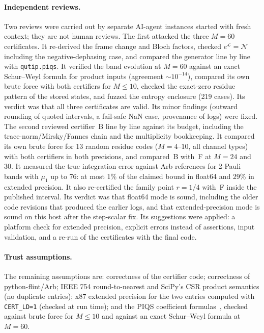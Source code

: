 \documentclass[aps,pra,reprint,superscriptaddress,nofootinbib,longbibliography,floatfix]{revtex4-2}
\theoremstyle{remark}
\begin{document}
\paragraph*{Independent reviews.} Two reviews were carried out by separate AI-agent instances
started with fresh context; they are not human reviews. The first attacked the three $M=60$
certificates. It re-derived the frame change and Bloch factors, checked $e^{\mathcal L}=\mathcal N$
including the negative-dephasing case, and compared the generator line by line with
\texttt{qutip.piqs}. It verified the band evolution at $M=60$ against an exact Schur--Weyl formula for
product inputs (agreement $\sim10^{-14}$), compared its own brute force with both certifiers for
$M\le10$, checked the exact-zero residue pattern of the stored states, and fuzzed the entropy enclosure
(219 cases). Its verdict was that all three certificates are valid. Its minor findings (outward rounding
of quoted intervals, a fail-safe NaN case, provenance of logs) were fixed. The second reviewed
certifier~B line by line against its budget, including the trace-norm/Mirsky/Fannes chain and the
multiplicity bookkeeping. It compared its own brute force for 13 random residue codes ($M=4$--$10$, all
channel types) with both certifiers in both precisions, and compared~B with~F at $M=24$ and $30$. It
measured the true integration error against Arb references for 2-Pauli bands with $\mu_1$ up to 76: at
most 1\% of the claimed bound in float64 and 29\% in extended precision. It also re-certified the family
point $r=1/4$ with~F inside the published interval. Its verdict was that float64 mode is sound, including the older code revisions that produced
the earlier logs, and that extended-precision mode is sound on this host after the step-scalar fix. Its suggestions were applied:
a platform check for extended precision, explicit errors instead of assertions, input validation, and a
re-run of the certificates with the final code.

\paragraph*{Trust assumptions.} The remaining assumptions are: correctness of the certifier code;
correctness of python-flint/Arb; IEEE 754 round-to-nearest and SciPy's CSR product semantics (no
duplicate entries); x87 extended precision for the two entries computed with \texttt{CERT\_LD=1} (checked at
run time); and the PIQS coefficient formulas~\cite{shammah2018piqs}, checked against brute force for
$M\le10$ and against an exact Schur--Weyl formula at $M=60$.
\end{document}
